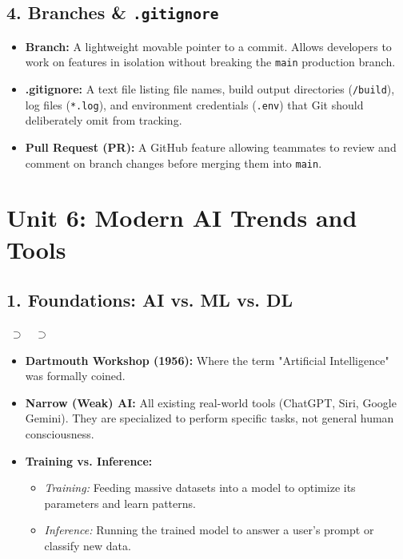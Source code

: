 \documentclass[a4paper,11pt]{article}
\begin{document}
\subsection{4. Branches \& \texttt{.gitignore}}
\begin{itemize}[leftmargin=5mm]
    \item \textbf{Branch:} A lightweight movable pointer to a commit. Allows developers to work on features in isolation without breaking the \texttt{main} production branch.
    \item \textbf{.gitignore:} A text file listing file names, build output directories (\texttt{/build}), log files (\texttt{*.log}), and environment credentials (\texttt{.env}) that Git should deliberately omit from tracking.
    \item \textbf{Pull Request (PR):} A GitHub feature allowing teammates to review and comment on branch changes before merging them into \texttt{main}.
\end{itemize}

\newpage

\section{Unit 6: Modern AI Trends and Tools}

\subsection{1. Foundations: AI vs. ML vs. DL}
\begin{center}
 $\;\supset\;$  $\;\supset\;$ 
\end{center}
\begin{itemize}[leftmargin=5mm]
    \item \textbf{Dartmouth Workshop (1956):} Where the term "Artificial Intelligence" was formally coined.
    \item \textbf{Narrow (Weak) AI:} All existing real-world tools (ChatGPT, Siri, Google Gemini). They are specialized to perform specific tasks, not general human consciousness.
    \item \textbf{Training vs. Inference:}
    \begin{itemize}
        \item \textit{Training:} Feeding massive datasets into a model to optimize its parameters and learn patterns.
        \item \textit{Inference:} Running the trained model to answer a user's prompt or classify new data.
    \end{itemize}
\end{itemize}
\end{document}
